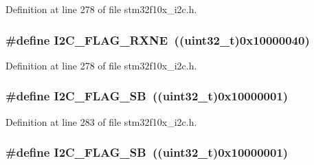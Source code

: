 Definition at line 278 of file stm32f10x\+\_\+i2c.\+h.

\subsubsection[{\texorpdfstring{I2\+C\+\_\+\+F\+L\+A\+G\+\_\+\+R\+X\+NE}{I2C_FLAG_RXNE}}]{\setlength{\rightskip}{0pt plus 5cm}\#define I2\+C\+\_\+\+F\+L\+A\+G\+\_\+\+R\+X\+NE~(({\bf uint32\+\_\+t})0x10000040)}\hypertarget{group___i2_c__flags__definition_gad53c5b70a186f699f187c7a641ab0dac}{}\label{group___i2_c__flags__definition_gad53c5b70a186f699f187c7a641ab0dac}


Definition at line 278 of file stm32f10x\+\_\+i2c.\+h.

\subsubsection[{\texorpdfstring{I2\+C\+\_\+\+F\+L\+A\+G\+\_\+\+SB}{I2C_FLAG_SB}}]{\setlength{\rightskip}{0pt plus 5cm}\#define I2\+C\+\_\+\+F\+L\+A\+G\+\_\+\+SB~(({\bf uint32\+\_\+t})0x10000001)}\hypertarget{group___i2_c__flags__definition_gae009ab84be03fcc438625b1c39376ad4}{}\label{group___i2_c__flags__definition_gae009ab84be03fcc438625b1c39376ad4}


Definition at line 283 of file stm32f10x\+\_\+i2c.\+h.

\subsubsection[{\texorpdfstring{I2\+C\+\_\+\+F\+L\+A\+G\+\_\+\+SB}{I2C_FLAG_SB}}]{\setlength{\rightskip}{0pt plus 5cm}\#define I2\+C\+\_\+\+F\+L\+A\+G\+\_\+\+SB~(({\bf uint32\+\_\+t})0x10000001)}\hypertarget{group___i2_c__flags__definition_gae009ab84be03fcc438625b1c39376ad4}{}\label{group___i2_c__flags__definition_gae009ab84be03fcc438625b1c39376ad4}


